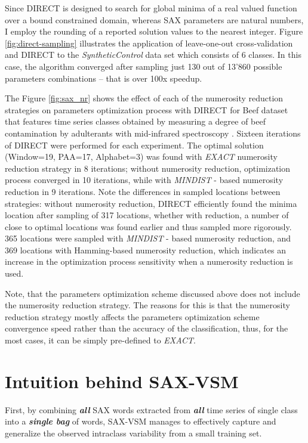 Since DIRECT is designed to search for global minima of a real valued function over a bound constrained domain, 
whereas SAX parameters are natural numbers, I employ the rounding of a reported solution values to the nearest integer.
Figure \ref{fig:direct-sampling} illustrates the application of leave-one-out cross-validation and DIRECT to the
\textit{SyntheticControl} data set \cite{ucr} which consists of 6 classes. 
In this case, the algorithm converged after sampling just 130 out of 13'860 possible parameters combinations -- 
that is over 100x speedup.

The Figure \ref{fig:sax_nr} shows the effect of each of the numerosity reduction strategies on parameters optimization
process with DIRECT for Beef dataset that features time series classes obtained by measuring a degree of beef contamination 
by adulterants with mid-infrared spectroscopy \cite{citeulike:12859637}. 
Sixteen iterations of DIRECT were performed for each experiment. 
The optimal solution (Window=19, PAA=17, Alphabet=3) was found with \textit{EXACT} numerosity reduction strategy 
in 8 iterations; without numerosity reduction, optimization process converged in 10 iterations, while 
with \textit{MINDIST} - based numerosity reduction in 9 iterations. 
Note the differences in sampled locations between strategies: without numerosity reduction, DIRECT efficiently found 
the minima location after sampling of 317 locations, whether with reduction, a number of close to optimal locations was 
found earlier and thus sampled more rigorously. 
365 locations were sampled with \textit{MINDIST} - based numerosity reduction, and 369 locations with Hamming-based 
numerosity reduction, which indicates an increase in the optimization process sensitivity when a numerosity reduction is used.

Note, that the parameters optimization scheme discussed above does not include the numerosity reduction strategy.
The reasons for this is that the numerosity reduction strategy mostly affects the parameters optimization scheme 
convergence speed rather than the accuracy of the classification, thus, for the most cases, it can be simply pre-defined 
to \textit{EXACT}.

\section{Intuition behind SAX-VSM}
First, by combining \textit{\textbf{all}} SAX words extracted from 
\textit{\textbf{all}} time series of single class into a \textit{\textbf{single bag}} of 
words, SAX-VSM manages to effectively capture and generalize the observed intraclass variability 
from a small training set.  

